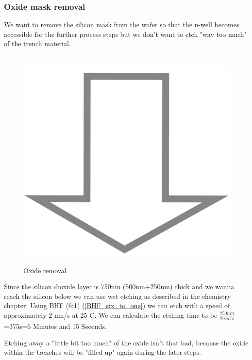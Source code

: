 \subsubsection{Oxide mask removal}
We want to remove the silicon mask from the wafer so that the n-well becomes accessible for the further process steps but we don't want to etch "way too much" of the trench material.
\begin{figure}[H]
	\centering
	\begin{tikzpicture}[node distance = 3cm, auto, thick,scale=\CrossSectionOnly, every node/.style={transform shape}]
		
	\end{tikzpicture} \\
	\includegraphics[scale=0.01]{down_arrow.png} \\
	\begin{tikzpicture}[node distance = 3cm, auto, thick,scale=\CrossSectionOnly, every node/.style={transform shape}]
		
	\end{tikzpicture}
	\caption{Oxide removal}
\end{figure}
Since the silicon dioxide layer is 750nm (500nm+250nm) thick and we wanna reach the silicon below we can use wet etching as described in the chemistry chapter.
Using BHF (6:1) (\autoref{BHF_six_to_one}) we can etch with a speed of approximately 2 nm/s at 25 \degree C.
We can calculate the etching time to be $\frac{750nm}{2nm/s}$=375s=6 Minutes and 15 Seconds.

Etching away a "little bit too much" of the oxide isn't that bad, because the oxide within the trenches will be "filled up" again during the later steps.
